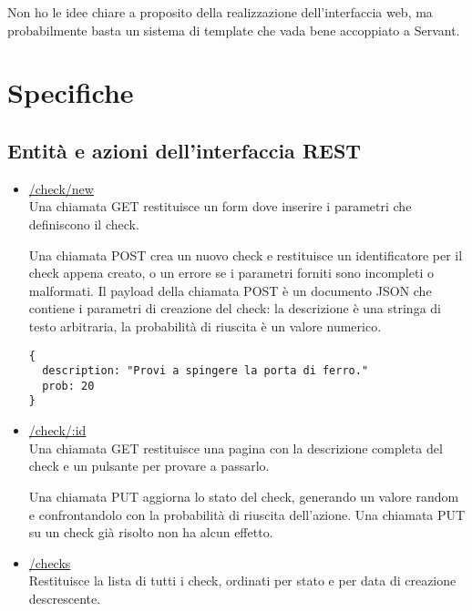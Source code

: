 \documentclass[a4paper]{article}
\begin{document}
Non ho le idee chiare a proposito della realizzazione dell'interfaccia
web, ma probabilmente basta un sistema di template che vada bene
accoppiato a Servant.

\section{Specifiche}

\subsection{Entit\`a e azioni dell'interfaccia REST}

\begin{itemize}
\item \url{/check/new} \\ Una chiamata GET restituisce un form dove
  inserire i parametri che definiscono il check.

  Una chiamata POST crea un nuovo check e restituisce un
  identificatore per il check appena creato, o un errore se i
  parametri forniti sono incompleti o malformati. Il payload della
  chiamata POST \`e un documento JSON che contiene i parametri di
  creazione del check: la descrizione \`e una stringa di testo
  arbitraria, la probabilit\`a di riuscita \`e un valore numerico.

\begin{verbatim}
{
  description: "Provi a spingere la porta di ferro."
  prob: 20
}  
\end{verbatim}

\item \url{/check/:id} \\ Una chiamata GET restituisce una pagina con
  la descrizione completa del check e un pulsante per provare a
  passarlo.

  Una chiamata PUT aggiorna lo stato del check, generando un valore
  random e confrontandolo con la probabilit\`a di riuscita
  dell'azione. Una chiamata PUT su un check gi\`a risolto non ha alcun
  effetto.
\item \url{/checks} \\ Restituisce la lista di tutti i check, ordinati
  per stato e per data di creazione descrescente.
\end{itemize}
\end{document}
